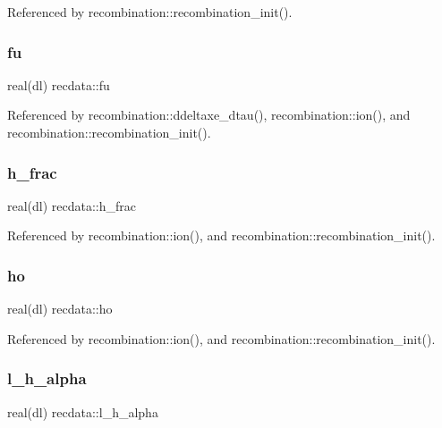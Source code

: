 Referenced by recombination\+::recombination\+\_\+init().

\mbox{\label{namespacerecdata_a29419b5fe5c4de5d80938025601d4eb9}} 
\subsubsection{\texorpdfstring{fu}{fu}}
{\footnotesize\ttfamily real(dl) recdata\+::fu}



Referenced by recombination\+::ddeltaxe\+\_\+dtau(), recombination\+::ion(), and recombination\+::recombination\+\_\+init().

\mbox{\label{namespacerecdata_ae9965fc6c0b6f37a85b51427e8155eb3}} 
\subsubsection{\texorpdfstring{h\+\_\+frac}{h\_frac}}
{\footnotesize\ttfamily real(dl) recdata\+::h\+\_\+frac}



Referenced by recombination\+::ion(), and recombination\+::recombination\+\_\+init().

\mbox{\label{namespacerecdata_a8f24dbf21d381a21986562167870de9b}} 
\subsubsection{\texorpdfstring{ho}{ho}}
{\footnotesize\ttfamily real(dl) recdata\+::ho}



Referenced by recombination\+::ion(), and recombination\+::recombination\+\_\+init().

\mbox{\label{namespacerecdata_adb25613b2cf535a5250d0040b5da8e8e}} 
\subsubsection{\texorpdfstring{l\+\_\+h\+\_\+alpha}{l\_h\_alpha}}
{\footnotesize\ttfamily real(dl) recdata\+::l\+\_\+h\+\_\+alpha}



